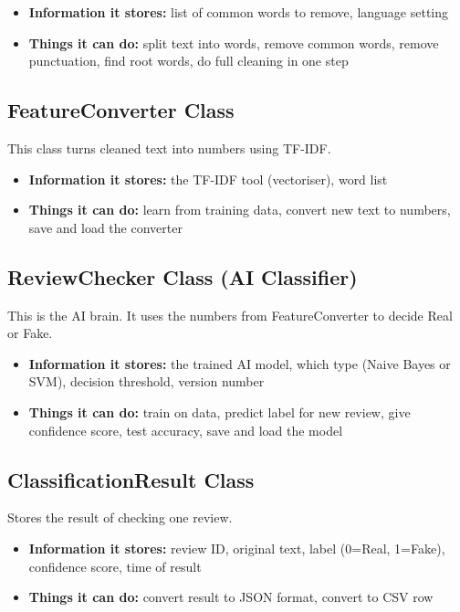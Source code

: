 \documentclass[10pt, a4paper]{report}
\begin{document}
\begin{itemize}
  \item \textbf{Information it stores:} list of common words to remove, language setting
  \item \textbf{Things it can do:} split text into words, remove common words, remove punctuation, find root words, do full cleaning in one step
\end{itemize}

\subsection{FeatureConverter Class}
This class turns cleaned text into numbers using TF-IDF.

\begin{itemize}
  \item \textbf{Information it stores:} the TF-IDF tool (vectoriser), word list
  \item \textbf{Things it can do:} learn from training data, convert new text to numbers, save and load the converter
\end{itemize}

\subsection{ReviewChecker Class (AI Classifier)}
This is the AI brain. It uses the numbers from FeatureConverter to decide Real or Fake.

\begin{itemize}
  \item \textbf{Information it stores:} the trained AI model, which type (Naive Bayes or SVM), decision threshold, version number
  \item \textbf{Things it can do:} train on data, predict label for new review, give confidence score, test accuracy, save and load the model
\end{itemize}

\subsection{ClassificationResult Class}
Stores the result of checking one review.

\begin{itemize}
  \item \textbf{Information it stores:} review ID, original text, label (0=Real, 1=Fake), confidence score, time of result
  \item \textbf{Things it can do:} convert result to JSON format, convert to CSV row
\end{itemize}
\end{document}
